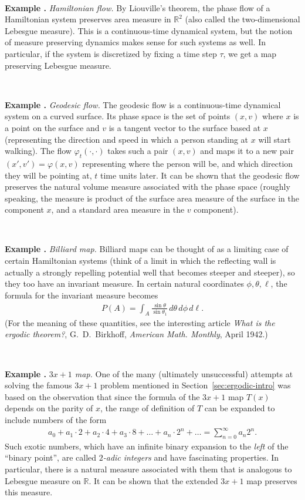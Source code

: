 \documentclass[12pt]{amsart}
\newcommand{\eqst}[1]{\begin{align*}#1\end{align*}}
\newcounter{example}
\newcommand{\beginexample}[1]{\ \\ \addtocounter{example}{1} \textbf{Example \arabic{example}.} \textit{#1.}}
\begin{document}
\beginexample{Hamiltonian flow} By Liouville's theorem, the phase flow of a Hamiltonian system preserves area measure in $\mathbb{R}^2$ (also called the two-dimensional Lebesgue measure). This is a continuous-time dynamical system, but the notion of  measure preserving dynamics makes sense for such systems as well. In particular, if the system is discretized by fixing a time step $\tau$, we get a map preserving Lebesgue measure.

\beginexample{Geodesic flow} The geodesic flow is a continuous-time dynamical system on a curved surface. Its phase space is the set of points $(x,v)$ where $x$ is a point on the surface and $v$ is a tangent vector to the surface based at $x$ (representing the direction and speed in which a person standing at $x$ will start walking). The flow $\varphi_t(\cdot,\cdot)$ takes such a pair $(x,v)$ and maps it to a new pair $(x',v')=\varphi(x,v)$ representing where the person will be, and which direction they will be pointing at, $t$ time units later. It can be shown that the geodesic flow preserves the natural volume measure associated with the phase space (roughly speaking, the measure is product of the surface area measure of the surface in the component $x$, and a standard area measure in the $v$ component).

\beginexample{Billiard map} Billiard maps can be thought of as a limiting case of certain Hamiltonian systems (think of a limit in which the reflecting wall is actually a strongly repelling potential well that becomes steeper and steeper), so they too have an invariant measure. In certain natural coordinates $\phi, \theta, \ell$, the formula for the invariant measure becomes
\eqst{ P(A) = \int_A \frac{\sin \theta}{\sin \theta_1}\, d\theta\, d\phi\, d\ell. }
(For the meaning of these quantities, see the interesting article \emph{What is the ergodic theorem?}, G.~D.~Birkhoff, \textit{American Math. Monthly}, April 1942.)

\beginexample{$3x+1$ map} One of the many (ultimately unsuccessful) attempts at solving the famous $3x+1$ problem mentioned in Section~\ref{sec:ergodic-intro} was based on the observation that since the formula of the $3x+1$ map $T(x)$ depends on the parity of $x$, the range of definition of $T$ can be expanded to include numbers of the form
\eqst{
a_0 + a_1 \cdot 2 + a_2 \cdot 4 + a_3\cdot 8 + \ldots + a_n \cdot 2^n + \ldots = \sum_{n=0}^\infty a_n 2^n.
}
Such exotic numbers, which have an infinite binary expansion to the \emph{left} of the ``binary point'', are called \emph{$2$-adic integers} and have fascinating properties. In particular, there is a natural measure associated with them that is analogous to Lebesgue measure on $\mathbb{R}$. It can be shown that the extended $3x+1$ map preserves this measure.
\end{document}
